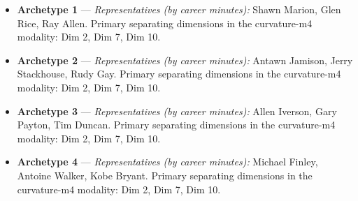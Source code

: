 \begin{itemize}
\item \textbf{Archetype 1} --- \emph{Representatives (by career minutes):} Shawn Marion, Glen Rice, Ray Allen. Primary separating dimensions in the curvature-m4 modality: Dim 2, Dim 7, Dim 10.
\item \textbf{Archetype 2} --- \emph{Representatives (by career minutes):} Antawn Jamison, Jerry Stackhouse, Rudy Gay. Primary separating dimensions in the curvature-m4 modality: Dim 2, Dim 7, Dim 10.
\item \textbf{Archetype 3} --- \emph{Representatives (by career minutes):} Allen Iverson, Gary Payton, Tim Duncan. Primary separating dimensions in the curvature-m4 modality: Dim 2, Dim 7, Dim 10.
\item \textbf{Archetype 4} --- \emph{Representatives (by career minutes):} Michael Finley, Antoine Walker, Kobe Bryant. Primary separating dimensions in the curvature-m4 modality: Dim 2, Dim 7, Dim 10.
\end{itemize}
